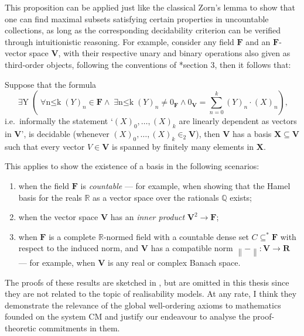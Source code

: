 \documentclass[12pt,openany]{book}
\theoremstyle{plain}
\theoremstyle{definition}
\newcommand\uppar[1]{{\upshape(}#1{\upshape)}}
\newcommand\uplabel[1]{\textup{(#1)}}
\newcommand\opA[1]{\mathop{\forall #1}}
\newcommand\opE[1]{\mathop{\exists #1}}
\newcommand\CM{\mathrm{CM}}
\newcommand\GWO{\mathrm{GWO}}
\begin{document}
This proposition can be applied just like the classical Zorn's lemma to show that one can find maximal subsets satisfying certain properties in uncountable collections, as long as the corresponding decidability criterion can be verified through intuitionistic reasoning. For example, consider any field $\mathbf{F}$ and an $\mathbf{F}$-vector space $\mathbf{V}$, with their respective unary and binary operations also given as third-order objects, following the conventions of \cite{weaver09-cm}*{section 3}, then it follows that:
\begin{corollary}[$\CM + \GWO$, \cite{wang-sw25-cm}*{Corollary 3.3}]
  Suppose that the formula
  \[\opE{Y} \left(\opA{n \leq k} \left(Y\right)_n \in \mathbf{F} \land \opE{n \leq k} \left(Y\right)_n \neq 0_\mathbf{F} \land 0_\mathbf{V} = \sum_{n = 0}^k \left(Y\right)_n \cdot \left(X\right)_n\right),\]
  i.e.\ informally the statement `$\left(X\right)_0, \ldots, \left(X\right)_k$ are linearly dependent as vectors in $\mathbf{V}$', is decidable \uppar{whenever $\left(X\right)_0, \ldots, \left(X\right)_k \in_2 \mathbf{V}$}, then $\mathbf{V}$ has a basis $\mathbf{X} \subseteq \mathbf{V}$ such that every vector $V \in \mathbf{V}$ is spanned by finitely many elements in $\mathbf{X}$.
\end{corollary}

This applies to show the existence of a basis in the following scenarios:
\begin{enumerate}[label=\uplabel{\alph*}]
  \item when the field $\mathbf{F}$ is \emph{countable} --- for example, when showing that the Hamel basis for the reals $\mathbb{R}$ as a vector space over the rationals $\mathbb{Q}$ exists;
  \item when the vector space $\mathbf{V}$ has an \emph{inner product} $\mathbf{V}^2 \rightarrow \mathbf{F}$;
  \item when $\mathbf{F}$ is a complete $\mathbb{R}$-normed field with a countable dense set $C \subseteq^* \mathbf{F}$ with respect to the induced norm, and $\mathbf{V}$ has a compatible norm $\left\|-\right\| : \mathbf{V} \rightarrow \mathbf{R}$ --- for example, when $\mathbf{V}$ is any real or complex Banach space.
\end{enumerate}
The proofs of these results are sketched in \cite{wang-sw25-cm}, but are omitted in this thesis since they are not related to the topic of realisability models. At any rate, I think they demonstrate the relevance of the global well-ordering axioms to mathematics founded on the system $\CM$ and justify our endeavour to analyse the proof-theoretic commitments in them.
\end{document}
